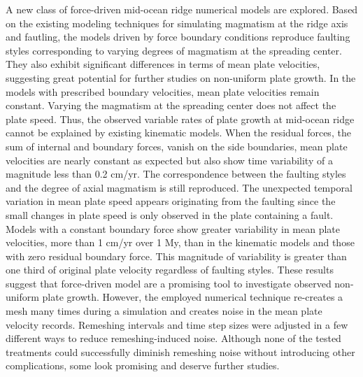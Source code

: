 \documentclass[letterpaper,12pt,notitle]{memphisthesis}                     %
\begin{document}
A new class of force-driven mid-ocean ridge numerical models are explored. 
Based on the existing modeling techniques for simulating magmatism at the ridge axis and fautling, the models driven by force boundary conditions reproduce faulting styles corresponding to varying degrees of magmatism at the spreading center. They also exhibit significant differences in terms of mean plate velocities, suggesting great potential for further studies on non-uniform plate growth. In the models with prescribed boundary velocities, mean plate velocities remain constant. Varying the magmatism at the spreading center does not affect the plate speed. Thus, the observed variable rates of plate growth at mid-ocean ridge cannot be explained by existing kinematic models. When the residual forces, the sum of internal and boundary forces, vanish on the side boundaries, mean plate velocities are nearly constant as expected but also show time variability of a magnitude less than 0.2 cm/yr. The correspondence between the faulting styles and the degree of axial magmatism is still reproduced. The unexpected temporal variation in mean plate speed appears originating from the faulting since the small changes in plate speed is only observed in the plate containing a fault. %
Models with a constant boundary force show greater variability in mean plate velocities, more than 1 cm/yr over 1 My, than in the kinematic models and those with zero residual boundary force. This magnitude of variability is greater than one third of original plate velocity regardless of faulting styles. These results suggest that force-driven model are a promising tool to investigate observed non-uniform plate growth. However, the employed numerical technique re-creates a mesh many times during a simulation and creates noise in the mean plate velocity records. Remeshing intervals and time step sizes were adjusted in a few different ways to reduce remeshing-induced noise. Although none of the tested treatments could successfully diminish remeshing noise without introducing other complications, some look promising and deserve further studies.

\end{document}
